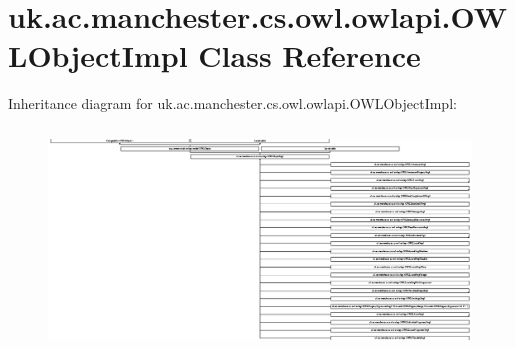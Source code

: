\hypertarget{classuk_1_1ac_1_1manchester_1_1cs_1_1owl_1_1owlapi_1_1_o_w_l_object_impl}{\section{uk.\-ac.\-manchester.\-cs.\-owl.\-owlapi.\-O\-W\-L\-Object\-Impl Class Reference}
\label{classuk_1_1ac_1_1manchester_1_1cs_1_1owl_1_1owlapi_1_1_o_w_l_object_impl}
}
Inheritance diagram for uk.\-ac.\-manchester.\-cs.\-owl.\-owlapi.\-O\-W\-L\-Object\-Impl\-:\begin{figure}[H]
\begin{center}
\leavevmode
\includegraphics[height=5.911490cm]{classuk_1_1ac_1_1manchester_1_1cs_1_1owl_1_1owlapi_1_1_o_w_l_object_impl}
\end{center}
\end{figure}

